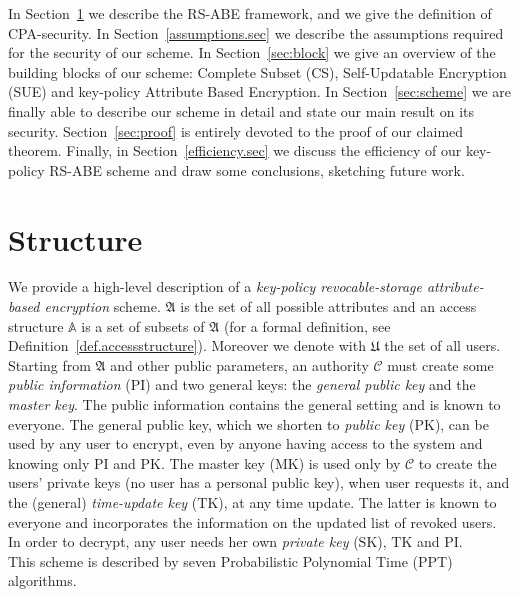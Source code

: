 \documentclass[a4paper,10pt]{article}
\newcommand{\PI}{\mathrm{PI}}
\begin{document}
	
	In Section~\ref{sec:structure} we describe the RS-ABE framework, and we give the definition of CPA-security. In Section~\ref{assumptions.sec} we describe the assumptions required for the security of our scheme. In Section~\ref{sec:block} we give an overview of the building blocks of our scheme: Complete Subset (CS), Self-Updatable Encryption (SUE) and key-policy Attribute Based Encryption. In Section~\ref{sec:scheme} we are finally able to describe our scheme in detail and  state our main result on its security.  Section~\ref{sec:proof} is entirely devoted to the proof of our claimed theorem. Finally, in Section~\ref{efficiency.sec} we discuss the efficiency of our key-policy RS-ABE scheme and draw some conclusions, sketching future work.
	


	\section{Structure}\label{sec:structure}
	We provide a high-level description of a \emph{key-policy revocable-storage at\-tri\-bute-based encryption} scheme. $\mathfrak{A}$ is the set of all possible attributes and an access structure $\mathbb{A}$ is a set of subsets of $\mathfrak{A}$ (for a formal definition, see Definition~\ref{def.accessstructure}). Moreover we denote with $\mathfrak{U}$ the set of all users. 
	Starting from $\mathfrak{A}$ and other public parameters, an authority  $\mathcal{C}$ must create some \emph{public information} ($\PI$) and two general keys:  the \emph{general public key} and the \emph{master key}. The public information contains the general setting and is known to everyone. The general public key, which we shorten to \emph{public key} ($\mathrm{PK}$), can be used by any user to encrypt, even by anyone having access to the system and knowing only $\PI$ and $\mathrm{PK}$. The master key ($\mathrm{MK}$) is used only by 
	$\mathcal{C}$ to create the users' private keys (no user has a personal public key), when user requests it, and the (general) \emph{time-update key} ($\mathrm{TK}$), at any time update. The latter is known to everyone and incorporates the information on the updated list of revoked users. In order to decrypt, any user needs her own \emph{private key} ($\mathrm{SK}$), $\mathrm{TK}$ and $\PI$.\\
	This scheme is described by seven Probabilistic Polynomial Time (PPT) algorithms. 
\end{document}

